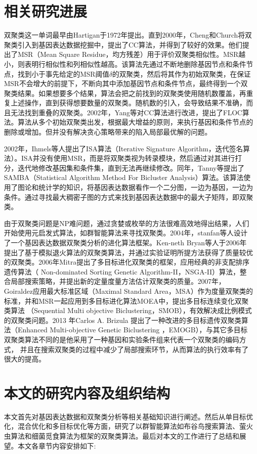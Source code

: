 \section{相关研究进展}
    双聚类这一单词最早由Hartigan于1972年提出。直到2000年，Cheng和Church将双聚类引入到基因表达数据挖掘中，提出了CC算法，并得到了较好的效果。他们提出了MSR（Mean Square Residue，均方残差）用于评价双聚类相似性。MSR越小，则表明行相似性和列相似性越高。该算法先通过不断地删除基因节点和条件节点，找到小于事先给定的MSR阈值$\delta$的双聚类，然后将其作为初始双聚类，在保证MSR不会增大的前提下，不断向其中添加基因节点和条件节点，最终得到一个双聚类结果。如果想要多个结果，算法会把之前找到的双聚类使用随机数覆盖，再重复上述操作，直到获得想要数量的双聚类。随机数的引入，会导致结果不准确，而且无法找到重叠的双聚类。2002年，Yang等对CC算法进行改进，提出了FLOC算法。算法从多个初始双聚类出发，根据最大增益的原则，来执行基因和条件节点的删除或增加。但并没有解决贪心策略带来的陷入局部最优解的问题。

    2002年，Ihmels等人提出了ISA算法（Iterative Signature Algorithm，迭代签名算法）。ISA并没有使用MSR，而是将双聚类视为转录模块，然后通过对其进行打分，迭代地修改基因集和条件集，直到无法再继续修改。同年，Tanny等提出了SAMBA（Statistical Algorithm Method For Bicluster Analysis）算法。该算法使用了图论和统计学的知识，将基因表达数据看作一个二分图，一边为基因，一边为条件。通过寻找最大稠密子图的方式来找到基因表达数据中的最大子矩阵，即双聚类。

    由于双聚类问题是NP难问题，通过贪婪或枚举的方法很难高效地得出结果，人们开始使用元启发式算法，如群智能算法来寻找双聚类。2004年，stanfan等人设计了一个基因表达数据双聚类分析的进化算法框架。Ken-neth Bryan等人于2006年提出了基于模拟退火算法的双聚类算法，并通过实验证明所提方法获得了质量较优的双聚类。2006年Mitra提出了多目标进化双聚类的框架，应用经典的非支配排序遗传算法（ Non-dominated Sorting Genetic Algorithm-II，NSGA-II）算法，整合局部搜索策略，并提出新的定量度量方法估计双聚类的质量。2007年，Goiraldez应用最大标准区域（Maximal Standard Area，MSA）作为度量双聚类的标准，并和MSR一起应用到多目标进化算法MOEA中，提出多目标连续变化双聚类算法 （Sequential Multi objective Biclustering，SMOB），有效解决成比例模式的双聚类问题。2013 年Carlos A. Brizula 提出了一种改进的多目标遗传双聚类算法（Enhanced Multi-objective Genetic Biclustering ，EMOGB），与其它多目标双聚类算法不同的是他采用了一种基因和实验条件组来代表一个双聚类的编码方式， 并且在搜索双聚类的过程中减少了局部搜索环节，从而算法的执行效率有了很大的提高。
    

\section{本文的研究内容及组织结构}
    本文首先对基因表达数据和双聚类分析等相关基础知识进行阐述。然后从单目标优化，混合优化和多目标优化等方面，研究了以群智能算法如布谷鸟搜索算法、萤火虫算法和细菌觅食算法为框架的双聚类算法。最后对本文的工作进行了总结和展望。本文各章节内容安排如下:

